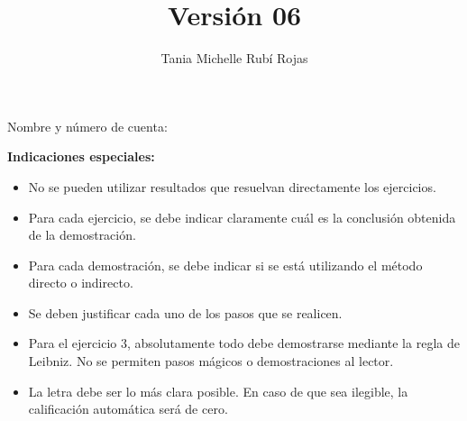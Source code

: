 \documentclass[oneside]{style}
\title{Versión 06}
\author{Tania Michelle Rubí Rojas}
\begin{document}
\maketitle

\vspace{2.5mm}
\noindent
Nombre y número de cuenta: \hrulefill\

\vspace{5mm}
\noindent
\textbf{Indicaciones especiales:}
{\small
\begin{multicols}{2}
\begin{itemize}
  \item No se pueden utilizar resultados que resuelvan directamente los 
  ejercicios. 

  \item Para cada ejercicio, se debe indicar claramente cuál es la conclusión 
  obtenida de la demostración. 

  \item Para cada demostración, se debe indicar si se está utilizando 
  el método directo o indirecto.  

  \item Se deben justificar cada uno de los pasos que se realicen. 
  
  \item Para el ejercicio $3$, absolutamente todo debe demostrarse mediante la 
  regla de Leibniz. No se permiten pasos mágicos o demostraciones al lector. 

  \item La letra debe ser lo más clara posible. En caso de que sea ilegible, 
  la calificación automática será de cero. 
\end{itemize}
\end{multicols}
}
\end{document}
